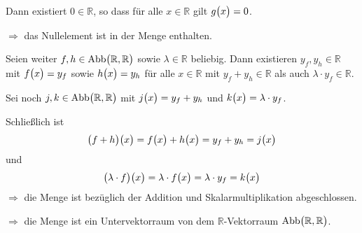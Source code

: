 \documentclass{scrreprt}
\begin{document}
\begin{enumerate}[(a)]
    Dann existiert $0 \in \mathbb{R}$, so dass für alle $x \in \mathbb{R}$
    gilt $g\qty\big(x) = 0$.

    $\Rightarrow$ das Nullelement ist in der Menge enthalten.

    Seien weiter $f, h \in \text{Abb}\qty\big(\mathbb{R}, \mathbb{R})$ sowie
    $\lambda \in \mathbb{R}$ beliebig.
    Dann existieren $y_f, y_h \in \mathbb{R}$ mit $f\qty\big(x) = y_f$ sowie
    $h\qty\big(x) = y_h$ für alle $x \in \mathbb{R}$ mit
    $y_f + y_h \in \mathbb{R}$ als auch $\lambda \cdot y_f \in \mathbb{R}$.

    Sei noch $j, k \in \text{Abb}\qty\big(\mathbb{R}, \mathbb{R})$ mit
    $j\qty\big(x) = y_f + y_h$ und $k\qty\big(x) = \lambda \cdot y_f$.

    Schließlich ist
    \[
      \qty\big(f + h)\qty\big(x) = f\qty\big(x) + h\qty\big(x) = y_f + y_h
      = j\qty\big(x)
    \]
    und
    \[
      \qty\big(\lambda \cdot f)\qty\big(x) = \lambda \cdot f\qty\big(x)
      = \lambda \cdot y_f = k\qty\big(x)
    \]
    $\Rightarrow$ die Menge ist bezüglich der Addition und Skalarmultiplikation
    abgeschlossen.

    $\Rightarrow$ die Menge ist ein Untervektorraum von dem $\mathbb{R}$-Vektorraum
    $\text{Abb}\qty\big(\mathbb{R}, \mathbb{R})$.
  \end{enumerate}
\end{document}
